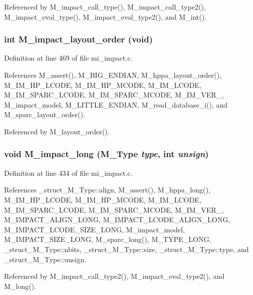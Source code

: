 Referenced by M\_\-impact\_\-call\_\-type(), M\_\-impact\_\-call\_\-type2(), M\_\-impact\_\-eval\_\-type(), M\_\-impact\_\-eval\_\-type2(), and M\_\-int().
\subsubsection{\setlength{\rightskip}{0pt plus 5cm}int M\_\-impact\_\-layout\_\-order (void)}\label{mi__impact_8c_0188118ac57cf68b68affa3255bb0537}




Definition at line 469 of file mi\_\-impact.c.

References M\_\-assert(), M\_\-BIG\_\-ENDIAN, M\_\-hppa\_\-layout\_\-order(), M\_\-IM\_\-HP\_\-LCODE, M\_\-IM\_\-HP\_\-MCODE, M\_\-IM\_\-LCODE, M\_\-IM\_\-SPARC\_\-LCODE, M\_\-IM\_\-SPARC\_\-MCODE, M\_\-IM\_\-VER\_, M\_\-impact\_\-model, M\_\-LITTLE\_\-ENDIAN, M\_\-read\_\-database\_\-i(), and M\_\-sparc\_\-layout\_\-order().

Referenced by M\_\-layout\_\-order().
\subsubsection{\setlength{\rightskip}{0pt plus 5cm}void M\_\-impact\_\-long (\bf{M\_\-Type} {\em type}, int {\em unsign})}\label{mi__impact_8c_a0c465cc15c576daef8c3948b7dbe65a}




Definition at line 434 of file mi\_\-impact.c.

References \_\-struct\_\-M\_\-Type::align, M\_\-assert(), M\_\-hppa\_\-long(), M\_\-IM\_\-HP\_\-LCODE, M\_\-IM\_\-HP\_\-MCODE, M\_\-IM\_\-LCODE, M\_\-IM\_\-SPARC\_\-LCODE, M\_\-IM\_\-SPARC\_\-MCODE, M\_\-IM\_\-VER\_, M\_\-IMPACT\_\-ALIGN\_\-LONG, M\_\-IMPACT\_\-LCODE\_\-ALIGN\_\-LONG, M\_\-IMPACT\_\-LCODE\_\-SIZE\_\-LONG, M\_\-impact\_\-model, M\_\-IMPACT\_\-SIZE\_\-LONG, M\_\-sparc\_\-long(), M\_\-TYPE\_\-LONG, \_\-struct\_\-M\_\-Type::nbits, \_\-struct\_\-M\_\-Type::size, \_\-struct\_\-M\_\-Type::type, and \_\-struct\_\-M\_\-Type::unsign.

Referenced by M\_\-impact\_\-call\_\-type2(), M\_\-impact\_\-eval\_\-type2(), and M\_\-long().
